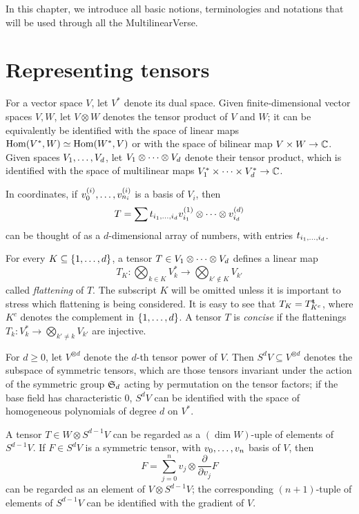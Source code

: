 In this chapter, we introduce all basic notions, terminologies and notations that will be used through all the MultilinearVerse. 

\section{Representing tensors}
\label{introduction-section-representingtensors}

For a vector space $V$, let $V^*$ denote its dual space. Given finite-dimensional vector spaces $V ,W$, let $V \otimes W$ denotes the tensor product of $V$ and $W$; it can be equivalently be identified with the space of linear maps $\operatorname{Hom}(V^*,W) \simeq \operatorname{Hom}(W^*,V)$ or with the space of bilinear map $V \times W \to \mathbb{C}$. Given spaces $V_1 , \ldots , V_d$, let $V_1 \otimes \cdots \otimes V_d$ denote their tensor product, which is identified with the space of multilinear maps $V_1^* \times \cdots \times V_d^* \to \mathbb{C}$.

In coordinates, if $v_0^{(i)} , \ldots , v^{(i)}_{n_i}$ is a basis of $V_i$, then 
\[
T = \sum t_{i_1 , \ldots , i_d} v^{(1)}_{i_1} \otimes \cdots \otimes v^{(d)}_{i_d}
\]
can be thought of as a $d$-dimensional array of numbers, with entries $t_{i_1 , \ldots , i_d}$. 

For every $K \subseteq \{1 , \ldots , d\}$, a tensor $T \in V_1 \otimes \cdots \otimes V_d$ defines a linear map 
\[
T_K : \bigotimes_{k \in K} V_{k}^* \to  \bigotimes_{k' \notin K} V_{k'}
\]
called \emph{flattening} of $T$. The subscript $K$ will be omitted unless it is important to stress which flattening is being considered. It is easy to see that $T_K = T_{K^c}^{\mathbf{t}}$, where $K^c$ denotes the complement in $\{1 , \ldots , d\}$. A tensor $T$ is \emph{concise} if the flattenings $T_k : V_k^* \to \bigotimes_{k' \neq k} V_{k'}$ are injective. 


For $d \geq 0$, let $V^{\otimes d}$ denote the $d$-th tensor power of $V$. Then $S^d V \subseteq V^{\otimes d}$ denotes the subspace of symmetric tensors, which are those tensors invariant under the action of the symmetric group $\mathfrak{S}_d$ acting by permutation on the tensor factors; if the base field has characteristic $0$, $S^d V$ can be identified with the space of homogeneous polynomials of degree $d$ on $V^*$. 

A tensor $T \in W \otimes S^{d-1} V$ can be regarded as a $(\dim W)$-uple of elements of $S^{d-1} V$. If $F \in S^d V$ is a symmetric tensor, with $v_0 , \ldots , v_n$ basis of $V$, then 
\[
F = \sum_{j=0}^n v_j \otimes \textstyle\frac{\partial }{\partial v_j} F
\]
can be regarded as an element of $V \otimes S^{d-1} V$; the corresponding $(n+1)$-tuple of elements of $S^{d-1} V$ can be identified with the gradient of $V$.

